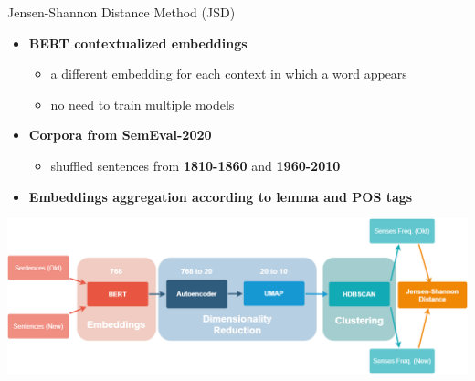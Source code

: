 \documentclass[10pt,aspectratio=1610,professionalfont]{beamer}
\begin{document}
\begin{frame}{Jensen-Shannon Distance Method (JSD)}
    \begin{itemize}
        \item \textbf{BERT contextualized embeddings}
        \begin{itemize}
            \item a different embedding for each context in which a word appears
            \item no need to train multiple models 
        \end{itemize}
        \item \textbf{Corpora from SemEval-2020}
        \begin{itemize}
            \item shuffled sentences from \textbf{1810-1860} and \textbf{1960-2010}
        \end{itemize}
        \item \textbf{Embeddings aggregation according to lemma and POS tags}
    \end{itemize}
	\centering
    \includegraphics[scale=0.33]{img/JSD.PNG}
\end{frame}
\end{document}
